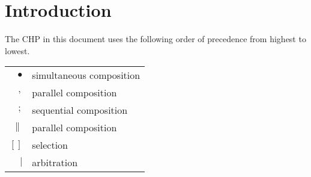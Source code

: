 \documentclass[aer.tex]{subfiles}
\begin{document}
\section{Introduction}

The CHP in this document uses the following order of precedence from highest to lowest.

\begin{center}
  \begin{tabular}[]{rl}
    $\bullet$ & simultaneous composition \\
    $,$ & parallel composition \\
    $;$ & sequential composition \\
    $\|$ & parallel composition \\
    $[\!]$ & selection \\ 
    $\mathtt{\vert}$ & arbitration \\
  \end{tabular}
\end{center}
\end{document}
